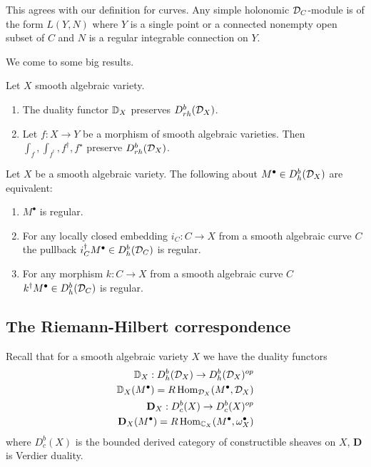This agrees with our definition for curves. Any simple holonomic ${\mathcal{D}}_C$-module
is of the form $L(Y,N)$ where $Y$ is a single point or a connected nonempty open subset
of $C$ and $N$ is a regular integrable connection on $Y$.

\hfill

We come to some big results.
\begin{theorem}
    Let $X$ smooth algebraic variety.
    \begin{enumerate}
        \item The duality functor $\mathbb{D}_X$ preserves $D^b_{rh}({\mathcal{D}}_X)$.
        \item Let $f:X\to Y$ be a morphism of smooth algebraic varieties.
        Then $\int_f,\int_{f^!},f^\dagger, f^\star$ preserve $D^b_{rh}({\mathcal{D}}_X)$.
    \end{enumerate}
\end{theorem}

\begin{theorem}
     Let $X$ be a smooth algebraic variety. The 
    following about $M^\bullet \in D^b_h({\mathcal{D}}_X)$ are equivalent:
    \begin{enumerate}
        \item $M^\bullet$ is regular.
        \item For any locally closed embedding $i_C:C\to X$ from a smooth algebraic curve $C$
        the pullback $i_C^\dagger M^\bullet \in D^b_h({\mathcal{D}}_C)$ is regular.
        \item For any morphism $k:C\to X$ from a smooth algebraic curve $C$ 
        $k^\dagger M^\bullet \in D^b_h({\mathcal{D}}_C)$ is regular.
    \end{enumerate}
\end{theorem}

\subsection{The Riemann-Hilbert correspondence}
Recall that for a smooth algebraic variety $X$ we have the duality functors \begin{align*}
    \mathbb{D}_X: D^b_h({\mathcal{D}}_X) \to D^b_h({\mathcal{D}}_X)^{op} \\
    \mathbb{D}_X(M^\bullet) = R\operatorname{Hom}_{{\mathcal{D}}_X}(M^\bullet,{\mathcal{D}}_X) \\
    \textbf{D}_X: D^b_c(X) \to D^b_c(X)^{op}  \\
    \textbf{D}_X(M^\bullet) = R\operatorname{Hom}_{\mathbb{C}_X}(M^\bullet,\omega_X^\bullet)
\end{align*} where $D^b_c(X)$ is the bounded derived category
 of constructible sheaves on $X$, \textbf{D} is Verdier duality.

